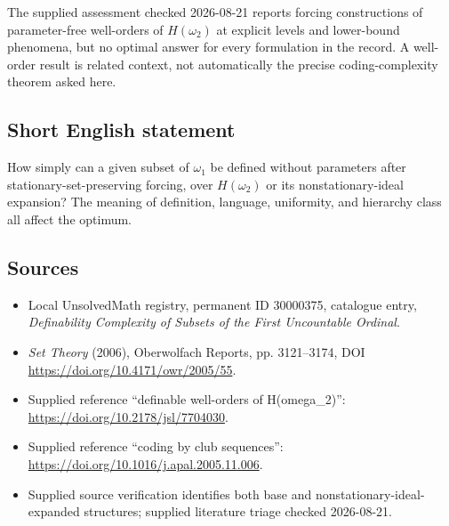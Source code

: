 \documentclass[11pt]{article}
\begin{document}
The supplied assessment checked 2026-08-21 reports forcing constructions of parameter-free well-orders of \(H(\omega_2)\) at explicit levels and lower-bound phenomena, but no optimal answer for every formulation in the record. A well-order result is related context, not automatically the precise coding-complexity theorem asked here.
\subsection{Short English statement}
How simply can a given subset of \(\omega_1\) be defined without parameters after stationary-set-preserving forcing, over \(H(\omega_2)\) or its nonstationary-ideal expansion? The meaning of definition, language, uniformity, and hierarchy class all affect the optimum.
\subsection{Sources}
\begin{itemize}
\item Local UnsolvedMath registry, permanent ID 30000375, catalogue entry, \emph{Definability Complexity of Subsets of the First Uncountable Ordinal}.
\item \emph{Set Theory} (2006), Oberwolfach Reports, pp. 3121--3174, DOI \url{https://doi.org/10.4171/owr/2005/55}.
\item Supplied reference ``definable well-orders of H(omega\_2)'': \url{https://doi.org/10.2178/jsl/7704030}.
\item Supplied reference ``coding by club sequences'': \url{https://doi.org/10.1016/j.apal.2005.11.006}.
\item Supplied source verification identifies both base and nonstationary-ideal-expanded structures; supplied literature triage checked 2026-08-21.
\end{itemize}
\end{document}
